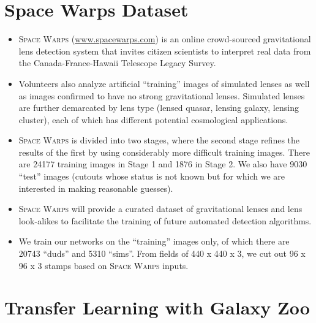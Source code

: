 \documentclass{ucbposter}
\begin{document}
\section{Space Warps Dataset}
\begin{itemize}
  \item{\textsc{Space Warps} (\url{www.spacewarps.com}) is an online crowd-sourced gravitational
    lens detection system that invites citizen
scientists to interpret real data from the Canada-France-Hawaii Telescope
Legacy Survey.}
\item{Volunteers also analyze artificial ``training'' images of simulated
    lenses as well as images confirmed to have no strong gravitational lenses.
    Simulated lenses are further demarcated by lens type (lensed quasar,
  lensing galaxy, lensing cluster), each of which has different potential
cosmological applications.}
\item{\textsc{Space Warps} is divided into two stages, where the second stage
    refines the results of the first by using considerably more difficult
  training images. There are 24177 training images in Stage 1 and 1876 in Stage
2. We also have 9030 ``test'' images (cutouts whose status is not known but for
which we are interested in making reasonable guesses).}
\item{\textsc{Space Warps} will provide a curated dataset of gravitational
  lenses and lens look-alikes to facilitate the training of future automated detection
algorithms.}
\item{We train our networks on the ``training'' images only, of which there are
  20743 ``duds'' and 5310 ``sims''. From fields of 440 x 440 x 3, we cut
  out 96 x 96 x 3 stamps based on \textsc{Space Warps} inputs.}
\end{itemize}




\section{Transfer Learning with Galaxy Zoo}

%
\end{document}
